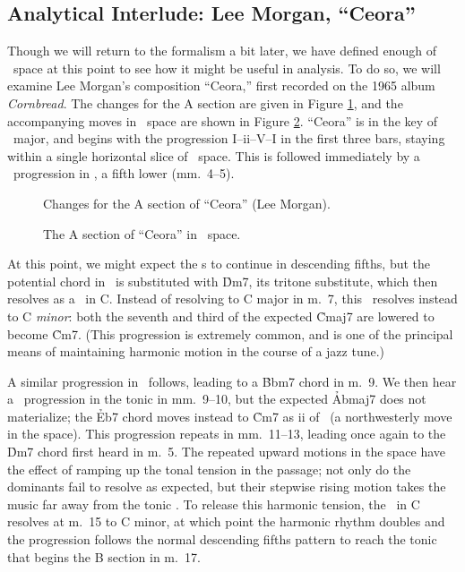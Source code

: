 


\FloatBarrier

\subsection{Analytical Interlude: Lee Morgan, “Ceora”}
\label{sec:ceora-analysis}

Though we will return to the formalism a bit later, we have defined enough of
\tf\ space at this point to see how it might be useful in analysis. To do so,
we will examine Lee Morgan's composition ``Ceora,'' first recorded on the 1965
album \emph{Cornbread}. The changes for the A section are given in
Figure \ref{tf:ceora-changes-1}, and the accompanying moves in \tf\ space are
shown in Figure \ref{tf:ceora-space-1}. ``Ceora'' is in the key of
\Aflat\ major, and begins with the progression I--ii--V--I in the first three
bars, staying within a single horizontal slice of \tf\ space. This is followed
immediately by a \tfo\ progression in \Dflat, a fifth lower (mm.~4--5).

\begin{figure}[thbp]
  \caption{Changes for the A section of ``Ceora'' (Lee Morgan).}
  \label{tf:ceora-changes-1}
\end{figure}

\begin{figure}[htbp]
  \caption{The A section of ``Ceora'' in \tf\ space.}
  \label{tf:ceora-space-1}
\end{figure}

At this point, we might expect the \tf{}s to continue in descending
fifths, but the potential \ii chord in \Gflat\ is substituted with
\h{Dm7}, its tritone substitute, which then resolves as a \tf\ in C.
Instead of resolving to C major in m.~7, this \tf\ resolves instead to C
\emph{minor}: both the seventh and third of the expected \h{Cmaj7} are lowered
to become \h{Cm7}. (This progression is extremely common, and is one of the
principal means of maintaining harmonic motion in the course of a jazz tune.)

A similar progression in \Bflat\ follows, leading to a \h{Bbm7} chord in m.~9.
We then hear a \tf\ progression in the tonic in mm.~9--10, but the
expected \h{Abmaj7} does not materialize; the \h{Eb7} chord moves instead to
\h{Cm7} as ii of \Bflat\ (a northwesterly move in the space). This
progression repeats in mm.~11--13, leading once again to the \h{Dm7} chord
first heard in m.~5. The repeated upward motions in the space have the
effect of ramping up the tonal tension in the passage; not only do the
dominants fail to resolve as expected, but their stepwise rising motion takes
the music far away from the tonic \Aflat. To release this harmonic tension,
the \tf\ in C resolves at m.~15 to C minor, at which point the harmonic rhythm
doubles and the progression follows the normal descending fifths pattern to
reach the tonic that begins the B section in m.~17.

